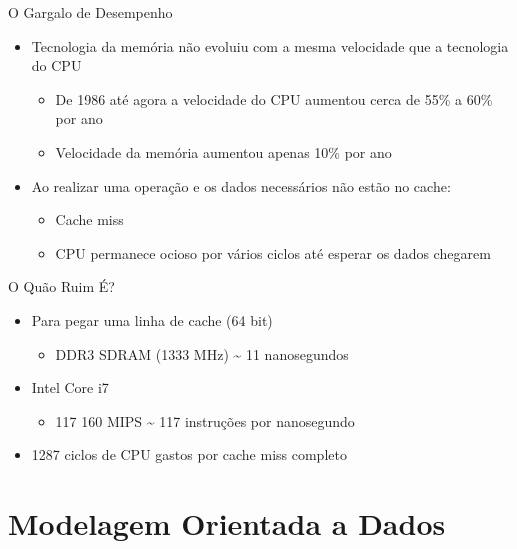 \documentclass{beamer}
\begin{document}
\begin{frame}[t]{O Gargalo de Desempenho}
    \begin{itemize}
        \item Tecnologia da memória não evoluiu com a mesma velocidade que a tecnologia 
            do CPU
        \begin{itemize}
            \item De 1986 até agora a velocidade do CPU aumentou cerca de 55\% a 60\% 
                por ano
            \item Velocidade da memória aumentou apenas 10\% por ano
        \end{itemize}
        \item Ao realizar uma operação e os dados necessários não estão no cache:
            \begin{itemize}
                \item Cache miss
                \item CPU permanece ocioso por vários ciclos até esperar os dados 
                    chegarem
            \end{itemize}
    \end{itemize}
\end{frame}

\begin{frame}[t]{O Quão Ruim É?}
    \vspace{1.5cm}
    \begin{itemize}
        \item Para pegar uma linha de cache (64 bit)
            \begin{itemize}
                \item DDR3 SDRAM (1333 MHz) \~{} 11 nanosegundos
            \end{itemize}
        \item Intel Core i7
            \begin{itemize}
                \item 117 160 MIPS \~{} 117 instruções por nanosegundo
            \end{itemize}
        \item 1287 ciclos de CPU gastos por cache miss completo
    \end{itemize}
\end{frame}

\section{Modelagem Orientada a Dados}
\end{document}
